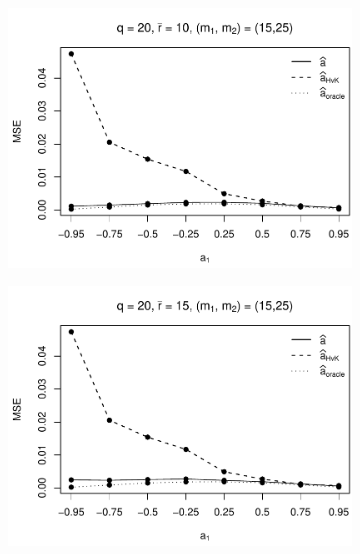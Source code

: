\begin{figure}[p]
\begin{subfigure}[b]{0.45\textwidth}
\includegraphics[width=\textwidth]{Plots/Robustness/MSE_a1_T=500_slope=10_(q,K1,K2,M1,M2)=(20,2,10,15,25).pdf}
\end{subfigure}
\hspace{0.25cm}
\begin{subfigure}[b]{0.45\textwidth}
\includegraphics[width=\textwidth]{Plots/Robustness/MSE_a1_T=500_slope=10_(q,K1,K2,M1,M2)=(20,2,15,15,25).pdf}
\end{subfigure}


\end{figure}
